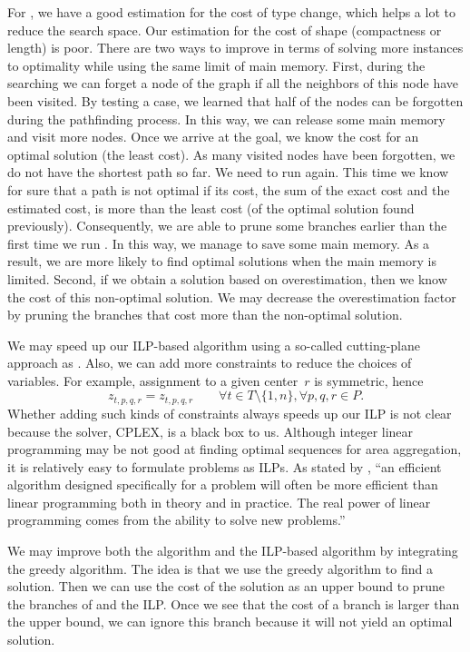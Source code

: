 For \Astar, we have a good estimation for the cost of type 
change, which helps a lot to reduce the search space. 
Our estimation for the cost of shape 
(compactness or length) is poor.
There are two ways to improve \Astar
in terms of solving more instances to optimality 
while using the same limit of main memory.
First, during the searching we can forget a node of the graph
if all the neighbors of this node have been visited.
By testing a case, we learned that half of the nodes can be 
forgotten during the pathfinding process.
In this way, we can release some main memory 
and visit more nodes.
Once we arrive at the goal, 
we know the cost for 
an optimal solution (the least cost).
As many visited nodes have been forgotten, 
we do not have the shortest path so far.
We need to run \Astar again.
This time we know for sure that 
a path is not optimal if its cost, 
the sum of the exact cost and the estimated cost, 
is more than the least cost 
(of the optimal solution found previously).
Consequently, we are able to prune some branches earlier 
than the first time we run \Astar.
In this way, we manage to save some main memory.
As a result, we are more likely to find optimal solutions
when the main memory is limited.
Second, if we obtain a solution based on overestimation, 
then we know the cost of this non-optimal solution.
We may decrease the overestimation factor by pruning the branches
that cost more than the non-optimal solution.


We may speed up our ILP-based algorithm using a so-called 
cutting-plane approach as \textcite{Oehrlein2017Aggregation}.
Also, we can add more constraints to
reduce the choices of variables.
For example, assignment to a given center~$r$ is symmetric, 
hence
\begin{equation*}
\label{eq:CstrZX}
z_{t,p,q,r}= z_{t,p,q,r} \qquad
\forall t \in {T} \setminus \{1,n\}, 
\forall p, q, r \in P.
\end{equation*}
Whether adding such kinds of constraints always
speeds up our ILP is not clear
because the solver, CPLEX, is a black box to us.
Although integer linear programming may be not good at 
finding optimal sequences for area aggregation,
it is relatively easy to formulate problems as ILPs.
As stated by \citet[p.~861]{Cormen2009}, 
``an efficient algorithm designed specifically for a problem 
will often be more efficient than 
linear programming both in theory and in practice. 
The real power of linear programming comes from 
the ability to solve new problems.''

We may improve both the \Astar algorithm and the ILP-based 
algorithm by integrating the greedy algorithm.
The idea is that we use the greedy algorithm to find 
a solution. 
Then we can use the cost of the solution as an upper bound to 
prune the branches of \Astar and the ILP. 
Once we see that
the cost of a branch is larger than the upper bound,
we can ignore this branch  
because it will not yield an optimal solution.



